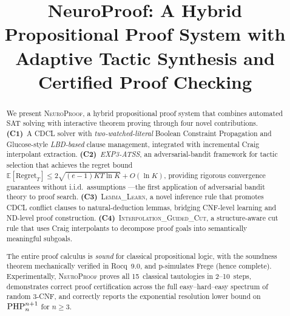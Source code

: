 \documentclass[conference]{IEEEtran}
\newcommand{\NP}{\textsc{NeuroProof}}
\newcommand{\PHP}{\textnormal{PHP}}
\begin{document}
\title{NeuroProof: A Hybrid Propositional Proof System with\\
  Adaptive Tactic Synthesis and Certified Proof Checking}



\author{
}

\maketitle

\begin{abstract}
We present \NP{}, a hybrid propositional proof system that
combines automated SAT solving with interactive theorem proving
through four novel contributions.
\textbf{(C1)}~A CDCL solver with \emph{two-watched-literal} Boolean
Constraint Propagation and Glucose-style \emph{LBD-based} clause
management, integrated with incremental Craig interpolant extraction.
\textbf{(C2)}~\emph{EXP3-ATSS}, an adversarial-bandit framework for
tactic selection that achieves the regret bound
$\mathbb{E}[\mathrm{Regret}_T] \leq 2\sqrt{(e-1)KT\ln K} + O(\ln K)$,
providing rigorous convergence guarantees without i.i.d.\ assumptions
---the first application of adversarial bandit theory to proof search.
\textbf{(C3)}~\textsc{Lemma\_Learn}, a novel inference rule that
promotes CDCL conflict clauses to natural-deduction lemmas, bridging
CNF-level learning and ND-level proof construction.
\textbf{(C4)}~\textsc{Interpolation\_Guided\_Cut}, a structure-aware
cut rule that uses Craig interpolants to decompose proof goals into
semantically meaningful subgoals.

The entire proof calculus is \emph{sound} for classical propositional
logic, with the soundness theorem mechanically verified in Rocq~9.0,
and p-simulates Frege (hence complete). Experimentally, \NP{} proves
all 15~classical tautologies in 2--10~steps, demonstrates correct
proof certification across the full easy--hard--easy spectrum of
random 3-CNF, and correctly reports the exponential
resolution lower bound on $\PHP_n^{n+1}$ for $n \ge 3$.
\end{abstract}
\end{document}
